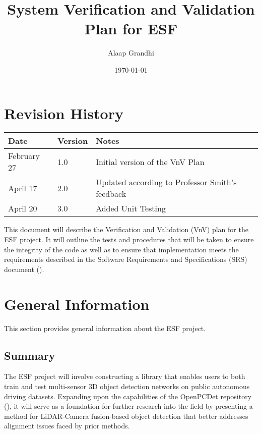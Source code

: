 \documentclass[12pt, titlepage]{article}
\newcommand{\ProjectName}{ESF }
\begin{document}
\title{System Verification and Validation Plan for \ProjectName{}} 
\author{Alaap Grandhi}
\date{\today}
	
\maketitle


\section*{Revision History}

\begin{tabularx}{\textwidth}{p{3cm}p{2cm}X}
\toprule {\bf Date} & {\bf Version} & {\bf Notes}\\
\midrule
February 27 & 1.0 & Initial version of the VnV Plan\\
April 17 & 2.0 & Updated according to Professor Smith's feedback\\
April 20 & 3.0 & Added Unit Testing \\
\bottomrule
\end{tabularx}

\newpage

\tableofcontents

\listoftables

\newpage


This document will describe the Verification and Validation (VnV) plan for the \ProjectName{}project. It will
outline the tests and procedures that will be taken to ensure the integrity of the code as well as to ensure that
implementation meets the requirements described in the Software Requirements and Specifications (SRS) document (\cite{SRS}).
\section{General Information}
This section provides general information about the \ProjectName{}project.
\subsection{Summary}

The \ProjectName{}project will involve constructing a library that enables users to both
train and test multi-sensor 3D object detection networks on public autonomous driving datasets. 
Expanding upon the capabilities of the OpenPCDet repository (\cite{openpcdet2020}), it will serve as a foundation for 
further research into the field by presenting a method for LiDAR-Camera fusion-based object 
detection that better addresses alignment issues faced by prior methods. 
\end{document}
